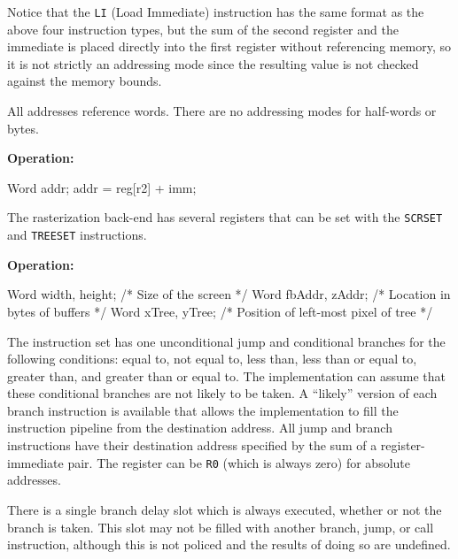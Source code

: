 \documentclass{book}
\begin{document}
Notice that the {\tt LI} (Load Immediate) instruction has the same format
as the above four instruction types, but the sum of the second register
and the immediate is placed directly into the first register without
referencing memory, so it is not strictly an addressing mode since
the resulting value is not checked against the memory bounds.

All addresses reference words.  There are no addressing modes for
half-words or bytes.

\begin{indented}{\bf Operation:}\vspace{.8ex}
\begin{verbatimtab}
Word addr;
addr = reg[r2] + imm;
\end{verbatimtab}
\end{indented}


The rasterization back-end has several registers that can be set with
the {\tt SCRSET} and {\tt TREESET} instructions.

\begin{indented}{\bf Operation:}\vspace{.8ex}
\begin{verbatimtab}
Word width, height;	/* Size of the screen */
Word fbAddr, zAddr;	/* Location in bytes of buffers */
Word xTree, yTree;	/* Position of left-most pixel of tree */
\end{verbatimtab}
\end{indented}


The instruction set has one unconditional jump and conditional
branches for the following conditions: equal to, not equal to, less
than, less than or equal to, greater than, and greater than or equal
to.  The implementation can assume that these conditional branches are
not likely to be taken.  A ``likely'' version of each branch
instruction is available that allows the implementation to fill the
instruction pipeline from the destination address.  All jump and
branch instructions have their destination address specified by the
sum of a register-immediate pair.  The register can be {\tt R0} (which
is always zero) for absolute addresses.

There is a single branch delay slot which is always executed, whether
or not the branch is taken.  This slot may not be filled with another
branch, jump, or call instruction, although this is not policed and
the results of doing so are undefined.
\end{document}
